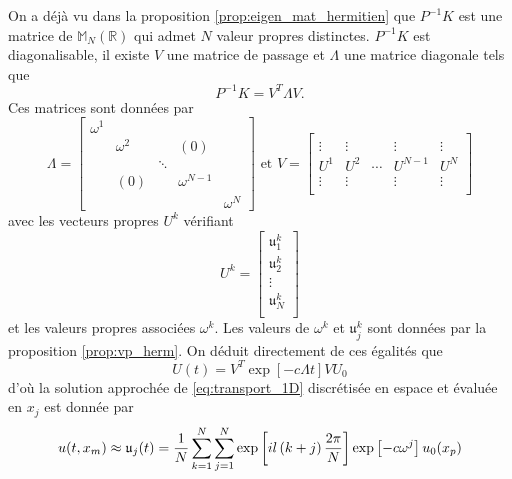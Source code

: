 On a déjà vu dans la proposition \ref{prop:eigen_mat_hermitien} que $P^{-1}K$ est une matrice de $\mathbb{M}_N(\mathbb{R})$ qui admet $N$ valeur propres distinctes. $P^{-1}K$ est diagonalisable, il existe $V$ une matrice de passage et $\Lambda$ une matrice diagonale tels que 
\begin{equation}
P^{-1}K = V^T \Lambda V.
\end{equation}
Ces matrices sont données par 
\begin{equation}
\Lambda = \begin{bmatrix}
\omega^1 &   &   &   &   \\ 
  & \omega^2 &   & (0) &   \\ 
  &   & \ddots &   &   \\ 
  & (0) &   & \omega^{N-1} &   \\ 
  &   &   &   & \omega^N
\end{bmatrix} \text{ et }
V = \begin{bmatrix}
  &   &   &   &   \\ 
\vdots & \vdots  &   & \vdots  & \vdots  \\ 
U^1 & U^2 & \cdots & U^{N-1} & U^N \\ 
\vdots &\vdots &  &\vdots &\vdots \\ 
  &   &   &   &  
\end{bmatrix} 
\end{equation}
avec les vecteurs propres $U^k$ vérifiant
\begin{equation}
U^k = \begin{bmatrix}
\mathfrak{u}^k_1\\
\mathfrak{u}^k_2\\
\vdots \\
\mathfrak{u}^k_N\\
\end{bmatrix}
\end{equation} 
et les valeurs propres associées $\omega^k$. Les valeurs de $\omega^k$ et $\mathfrak{u}^k_j$ sont données par la proposition \ref{prop:vp_herm}. On déduit directement de ces égalités que 
\begin{equation}
U(t) = V^T \exp \left[-c \Lambda t \right] V U_0
\end{equation}
d'où la solution approchée de \eqref{eq:transport_1D} discrétisée en espace et évaluée en $x_j$ est donnée par 
\begin{equation}
u(t,x_m) \approx \mathfrak{u}_j(t) = \dfrac{1}{N} \displaystyle\sum\limits_{k=1}^N \displaystyle\sum\limits_{j=1}^N  \exp \left[ i l \left( k + j \right) \dfrac{2 \pi}{N} \right] \exp \left[ - c \omega^j \right] u_0(x_p)
\end{equation}


